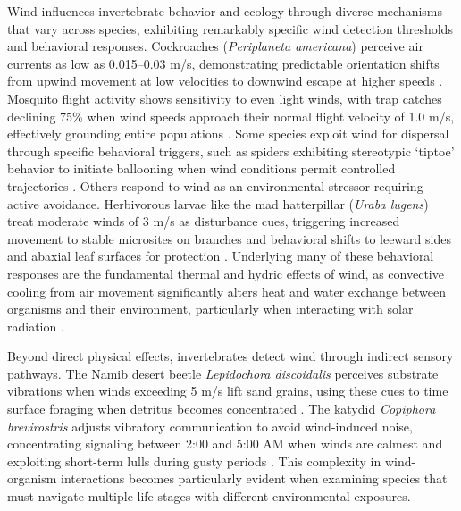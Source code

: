 Wind influences invertebrate behavior and ecology through diverse mechanisms that vary across species, exhibiting remarkably specific wind detection thresholds and behavioral responses. Cockroaches (\textit{Periplaneta americana}) perceive air currents as low as 0.015--0.03 m/s, demonstrating predictable orientation shifts from upwind movement at low velocities to downwind escape at higher speeds \parencite{bellSearchAnemotacticOrientation1979}. Mosquito flight activity shows sensitivity to even light winds, with trap catches declining 75\% when wind speeds approach their normal flight velocity of 1.0 m/s, effectively grounding entire populations \parencite{bidlingmayerEffectWindVelocity1995}. Some species exploit wind for dispersal through specific behavioral triggers, such as spiders exhibiting stereotypic `tiptoe' behavior to initiate ballooning when wind conditions permit controlled trajectories \parencite{bonteHeritabilitySpiderBallooning2007}. Others respond to wind as an environmental stressor requiring active avoidance. Herbivorous larvae like the mad hatterpillar (\textit{Uraba lugens}) treat moderate winds of 3 m/s as disturbance cues, triggering increased movement to stable microsites on branches and behavioral shifts to leeward sides and abaxial leaf surfaces for protection \parencite{leonardExposureWindAlters2016}. Underlying many of these behavioral responses are the fundamental thermal and hydric effects of wind, as convective cooling from air movement significantly alters heat and water exchange between organisms and their environment, particularly when interacting with solar radiation \parencite{riddellWindNicheThermal2025}.

Beyond direct physical effects, invertebrates detect wind through indirect sensory pathways. The Namib desert beetle \textit{Lepidochora discoidalis} perceives substrate vibrations when winds exceeding 5 m/s lift sand grains, using these cues to time surface foraging when detritus becomes concentrated \parencite{hanrahanEffectWindForaging1997}. The katydid \textit{Copiphora brevirostris} adjusts vibratory communication to avoid wind-induced noise, concentrating signaling between 2:00 and 5:00 AM when winds are calmest and exploiting short-term lulls during gusty periods \parencite{velillaGoneWindSignal2020}. This complexity in wind-organism interactions becomes particularly evident when examining species that must navigate multiple life stages with different environmental exposures.

